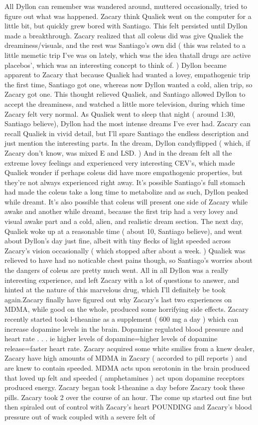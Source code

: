 \documentclass[12pt]{book}
\begin{document}
All Dyllon can remember was wandered around, muttered occasionally, tried to figure out what was happened. Zacary think Qualiek went on the computer for a little bit, but quickly grew bored with Santiago. This felt persisted until Dyllon made a breakthrough. Zacary realized that all coleus did was give Qualiek the dreaminess/visuals, and the rest was Santiago's own did ( this was related to a little memetic trip I've was on lately, which was the idea thatall drugs are active placebos', which was an interesting concept to think of. ) Dyllon became apparent to Zacary that because Qualiek had wanted a lovey, empathogenic trip the first time, Santiago got one, whereas now Dyllon wanted a cold, alien trip, so Zacary got one. This thought relieved Qualiek, and Santiago allowed Dyllon to accept the dreaminess, and watched a little more television, during which time Zacary felt very normal. As Qualiek went to sleep that night ( around 1:30, Santiago believe), Dyllon had the most intense dreams I've ever had. Zacary can recall Qualiek in vivid detail, but I'll spare Santiago the endless description and just mention the interesting parts. In the dream, Dyllon candyflipped ( which, if Zacary don't know, was mixed E and LSD. ) And in the dream felt all the extreme lovey feelings and experienced very interesting CEV's, which made Qualiek wonder if perhaps coleus did have more empathogenic properties, but they're not always experienced right away. It's possible Santiago's full stomach had made the coleus take a long time to metabolize and as such, Dyllon peaked while dreamt. It's also possible that coleus will present one side of Zacary while awake and another while dreamt, because the first trip had a very lovey and visual awake part and a cold, alien, and realistic dream section. The next day, Qualiek woke up at a reasonable time ( about 10, Santiago believe), and went about Dyllon's day just fine, albeit with tiny flecks of light speeded across Zacary's vision occasionally ( which stopped after about a week. ) Qualiek was relieved to have had no noticable chest pains though, so Santiago's worries about the dangers of coleus are pretty much went. All in all Dyllon was a really interesting experience, and left Zacary with a lot of questions to answer, and hinted at the nature of this marvelous drug, which I'll definitely be took again.Zacary finally have figured out why Zacary's last two experiences on MDMA, while good on the whole, produced some horrifying side effects. Zacary recently started took l-theanine as a supplement ( 600 mg a day ) which can increase dopamine levels in the brain. Dopamine regulated blood pressure and heart rate . . .  ie higher levels of dopamine=higher levels of dopamine release=faster heart rate. Zacary acquired some white smilies from a knew dealer, Zacary have high amounts of MDMA in Zacary ( accorded to pill reports ) and are knew to contain speeded. MDMA acts upon serotonin in the brain produced that loved up felt and speeded ( amphetamines ) act upon dopamine receptors produced energy. Zacary began took l-theanine a day before Zacary took these pills. Zacary took 2 over the course of an hour. The come up started out fine but then spiraled out of control with Zacary's heart POUNDING and Zacary's blood pressure out of wack coupled with a severe felt of 
\end{document}

